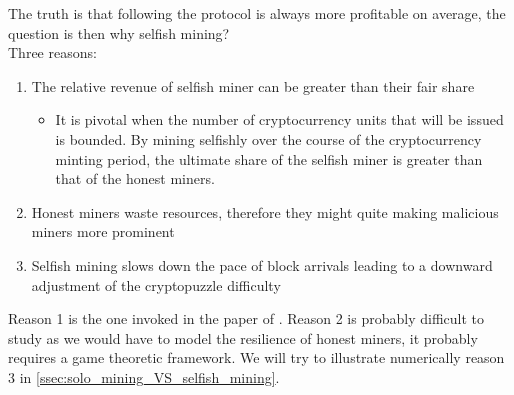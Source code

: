 The truth is that following the protocol is always more profitable on average, the question is then why selfish mining?\\

Three reasons:
\begin{enumerate}
  \item The relative revenue of selfish miner can be greater than their fair share
  \begin{itemize}
    \item It is pivotal when the number of cryptocurrency units that will be issued is bounded. By mining selfishly over the course of the cryptocurrency minting period, the ultimate share of the selfish miner is greater than that of the honest miners.
  \end{itemize}
  \item Honest miners waste resources, therefore they might quite making malicious miners more prominent
  \item Selfish mining slows down the pace of block arrivals leading to a downward adjustment of the cryptopuzzle difficulty
\end{enumerate}
Reason 1 is the one invoked in the paper of \citet{Eyal2014}. Reason 2 is probably difficult to study as we would have to model the resilience of honest miners, it probably requires a game theoretic framework. We will try to illustrate numerically reason 3 in \cref{ssec:solo_mining_VS_selfish_mining}.

